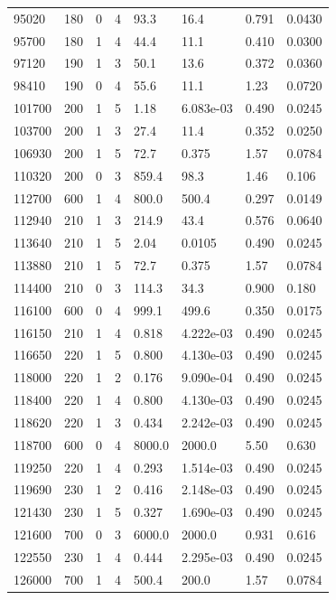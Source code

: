 \documentclass[preview]{standalone}
\begin{document}
{{{\begin{tabular}{L{1.2cm}C{1.2cm} C{0.3cm}C{0.5cm} C{1.4cm}C{1.4cm} C{1.4cm}C{1.4cm}}
  95020  &   180  & 0     &  4 &  93.3  & 16.4  & 0.791 &  0.0430   \\ 
  95700  &   180  & 1     &  4 &  44.4  & 11.1  & 0.410 &  0.0300   \\ 
  97120  &   190  & 1     &  3 &  50.1  & 13.6  & 0.372 &  0.0360   \\ 
  98410  &   190  & 0     &  4 &  55.6  & 11.1  & 1.23 &  0.0720   \\ 
  101700  &   200  & 1     &  5 &  1.18  & 6.083e-03  & 0.490 &  0.0245   \\ 
  103700  &   200  & 1     &  3 &  27.4  & 11.4  & 0.352 &  0.0250   \\ 
  106930  &   200  & 1     &  5 &  72.7  & 0.375  & 1.57 &  0.0784   \\ 
  110320  &   200  & 0     &  3 &  859.4  & 98.3  & 1.46 &  0.106   \\ 
  112700  &   600  & 1     &  4 &  800.0  & 500.4  & 0.297 &  0.0149   \\ 
  112940  &   210  & 1     &  3 &  214.9  & 43.4  & 0.576 &  0.0640   \\ 
  113640  &   210  & 1     &  5 &  2.04  & 0.0105  & 0.490 &  0.0245   \\ 
  113880  &   210  & 1     &  5 &  72.7  & 0.375  & 1.57 &  0.0784   \\ 
  114400  &   210  & 0     &  3 &  114.3  & 34.3  & 0.900 &  0.180   \\ 
  116100  &   600  & 0     &  4 &  999.1  & 499.6  & 0.350 &  0.0175   \\ 
  116150  &   210  & 1     &  4 &  0.818  & 4.222e-03  & 0.490 &  0.0245   \\ 
  116650  &   220  & 1     &  5 &  0.800  & 4.130e-03  & 0.490 &  0.0245   \\ 
  118000  &   220  & 1     &  2 &  0.176  & 9.090e-04  & 0.490 &  0.0245   \\ 
  118400  &   220  & 1     &  4 &  0.800  & 4.130e-03  & 0.490 &  0.0245   \\ 
  118620  &   220  & 1     &  3 &  0.434  & 2.242e-03  & 0.490 &  0.0245   \\ 
  118700  &   600  & 0     &  4 &  8000.0  & 2000.0  & 5.50 &  0.630   \\ 
  119250  &   220  & 1     &  4 &  0.293  & 1.514e-03  & 0.490 &  0.0245   \\ 
  119690  &   230  & 1     &  2 &  0.416  & 2.148e-03  & 0.490 &  0.0245   \\ 
  121430  &   230  & 1     &  5 &  0.327  & 1.690e-03  & 0.490 &  0.0245   \\ 
  121600  &   700  & 0     &  3 &  6000.0  & 2000.0  & 0.931 &  0.616   \\ 
  122550  &   230  & 1     &  4 &  0.444  & 2.295e-03  & 0.490 &  0.0245   \\ 
  126000  &   700  & 1     &  4 &  500.4  & 200.0  & 1.57 &  0.0784   \\ 
\hline 
\end{tabular} 

}}}
\end{document}

